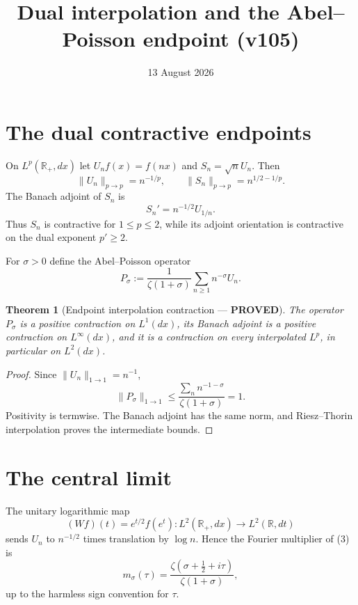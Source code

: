 \documentclass[11pt]{article}
\title{Dual interpolation and the Abel--Poisson endpoint (v105)}
\date{13 August 2026}
\newcommand{\PROVED}{\textcolor{green!40!black}{\textbf{PROVED}}}
\newtheorem{theorem}{Theorem}
\begin{document}
\maketitle

\section{The dual contractive endpoints}

On $L^p(\mathbb R_+,dx)$ let $U_nf(x)=f(nx)$ and
$S_n=\sqrt nU_n$.  Then
\begin{equation}
 \|U_n\|_{p\to p}=n^{-1/p},\qquad
 \|S_n\|_{p\to p}=n^{1/2-1/p}.                       \tag{1}
\end{equation}
The Banach adjoint of $S_n$ is
\begin{equation}
                  S_n'=n^{-1/2}U_{1/n}.              \tag{2}
\end{equation}
Thus $S_n$ is contractive for $1\le p\le2$, while its adjoint orientation
is contractive on the dual exponent $p'\ge2$.

For $\sigma>0$ define the Abel--Poisson operator
\begin{equation}
 P_\sigma:=\frac1{\zeta(1+\sigma)}
                \sum_{n\ge1}n^{-\sigma}U_n.          \tag{3}
\end{equation}

\begin{theorem}[Endpoint interpolation contraction --- \PROVED]
The operator $P_\sigma$ is a positive contraction on $L^1(dx)$, its Banach
adjoint is a positive contraction on $L^\infty(dx)$, and it is a contraction
on every interpolated $L^p$, in particular on $L^2(dx)$.
\end{theorem}

\begin{proof}
Since $\|U_n\|_{1\to1}=n^{-1}$,
\[
 \|P_\sigma\|_{1\to1}
 \le\frac{\sum_n n^{-1-\sigma}}{\zeta(1+\sigma)}=1.
\]
Positivity is termwise.  The Banach adjoint has the same norm, and
Riesz--Thorin interpolation proves the intermediate bounds.
\end{proof}

\section{The central limit}

The unitary logarithmic map
\[
 (Wf)(t)=e^{t/2}f(e^t):L^2(\mathbb R_+,dx)\longrightarrow L^2(\mathbb R,dt)
\]
sends $U_n$ to $n^{-1/2}$ times translation by $\log n$.  Hence the Fourier
multiplier of (3) is
\begin{equation}
 m_\sigma(\tau)=
 \frac{\zeta(\sigma+\tfrac12+i\tau)}{\zeta(1+\sigma)},          \tag{4}
\end{equation}
up to the harmless sign convention for $\tau$.
\end{document}
